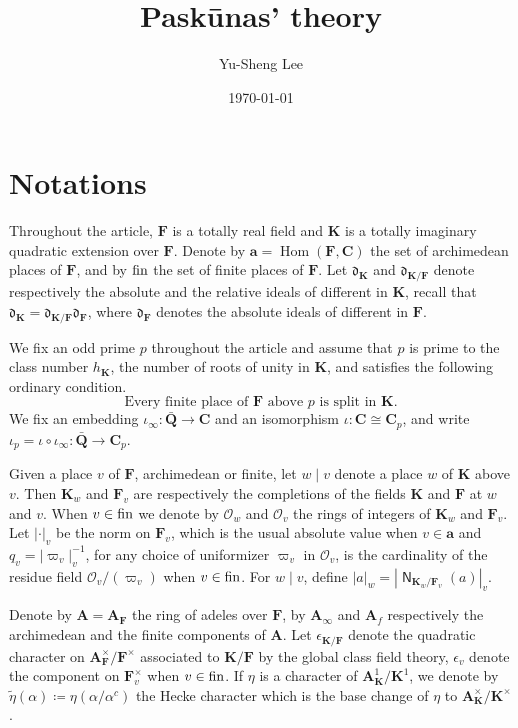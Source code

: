 \documentclass[leqno]{amsart}
\newcommand{\fin}{\textnormal{fin}}
\newcommand{\Q}{{\mathbf{Q}}}
\newcommand{\C}{\mathbf C}
\newcommand{\A}{\mathbf A}
\newcommand{\dd}{\mathfrak{d}} %
\DeclareMathOperator{\Nr}{\mathsf{N}} %
\newcommand{\arch}{\mathbf{a}}
\newcommand{\F}{{\mathbf{F}}} %
\newcommand{\K}{{\mathbf{K}}} %
\newcommand{\qch}{\epsilon} %
\newcommand{\oo}{\mathcal{O}} %
\DeclareMathOperator{\Hom}{Hom}
\theoremstyle{definition}
\theoremstyle{remark}
\begin{document}
\title{Pask\={u}nas' theory}
\author[Y-S.~Lee]{Yu-Sheng Lee}
\address{Department of Mathematics, University  of Michigan, Ann Arbor, MI 48109, USA}
\date{\today}

\maketitle
\setcounter{tocdepth}{1}
\tableofcontents

\section{Notations}

Throughout the article, $\F$ is a totally real field
and $\K$ is a totally imaginary quadratic extension over $\F$.
Denote by $\arch=\Hom(\F, \C)$ 
the set of archimedean places of $\F$,
and by $\fin$ the set of finite places of $\F$.
Let $\dd_\K$ and $\dd_{\K/\F}$ denote respectively 
the absolute and the relative ideals of different in $\K$,
recall that $\dd_\K=\dd_{\K/\F}\dd_\F$,
where $\dd_\F$ denotes 
the absolute ideals of different in $\F$.

We fix an odd prime $p$ throughout the article
and assume that $p$ is prime to the class number $h_\K$,
the number of roots of unity in $\K$,
and satisfies the following ordinary condition.
\begin{equation}\label{cond:ord}\tag{ord}
\text{Every finite place of $\F$ above $p$ is split in $\K$}.
\end{equation}
We fix an embedding $\iota_\infty:\bar{\Q}\to \C$
and an isomorphism $\iota:\C\cong \C_p$,
and write $\iota_p=\iota\circ\iota_\infty:\bar{\Q}\to \C_p$.


Given a place $v$ of $\F$, archimedean or finite,
let $w\mid v$ denote a place $w$ of $\K$ above $v$.
Then $\K_w$ and $\F_v$ are respectively
the completions of the fields $\K$ and $\F$ at $w$ and $v$.
When $v\in \fin$ we denote by $\oo_w$ and $\oo_v$ 
the rings of integers of $\K_w$ and $\F_v$.
Let $|\cdot|_v$ be the norm on $\F_v$,
which is the usual absolute value when $v\in \arch$
and $q_v=|\varpi_v|_v^{-1}$,
for any choice of uniformizer $\varpi_v$ in $\oo_v$,
is the cardinality of the residue field $\oo_v/(\varpi_v)$
when $v\in \fin$.
For $w\mid v$, define $|a|_w=|\Nr_{\K_w/\F_v}(a)|_v$.


Denote by $\A=\A_{\F}$ the ring of adeles over $\F$,
by $\A_{\infty}$ and $\A_{f}$ respectively
the archimedean and the finite components of $\A$.
Let $\qch_{\K/\F}$ denote 
the quadratic character on $\A_\F^\times/\F^\times$
associated to $\K/\F$ by the global class field theory,
$\qch_v$ denote the component on $\F_v^\times$ 
when $v\in \fin$.
If $\eta$ is a character of $\A_\K^1/\K^1$, 
we denote
by $\tilde{\eta}(\alpha)\coloneqq \eta(\alpha/\alpha^c)$
the Hecke character which is the base change of $\eta$ 
to $\A_\K^\times/\K^\times$.
\end{document}
